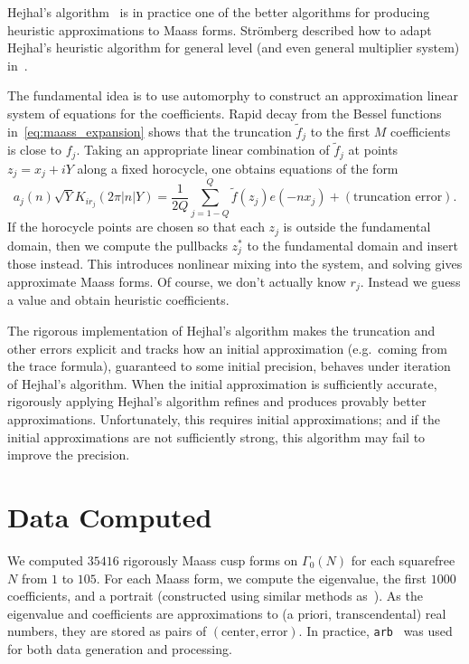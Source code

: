 \documentclass[11pt,reqno,oneside]{amsart}
\theoremstyle{plain}
\theoremstyle{definition}
\begin{document}
Hejhal's algorithm~\cite{hejhal1999eigenfunctions} is in practice one of the
better algorithms for producing heuristic approximations to Maass forms.
Str\"omberg described how to adapt Hejhal's heuristic algorithm for general
level (and even general multiplier system)
in~\cite{stromberg2005computational}.

The fundamental idea is to use automorphy to construct an approximation linear
system of equations for the coefficients.
Rapid decay from the Bessel functions in~\eqref{eq:maass_expansion} shows that
the truncation $\widetilde{f}_j$ to the first $M$ coefficients is close to
$f_j$.
Taking an appropriate linear combination of $\widetilde{f}_j$ at points $z_j =
x_j + iY$ along a fixed horocycle, one obtains equations of the form
\begin{equation}
  a_j(n) \sqrt{Y} K_{ir_j}(2 \pi \lvert n \rvert Y)
  =
  \frac{1}{2Q} \sum_{j = 1 - Q}^Q \widetilde{f}(z_j) e(-nx_j)
  +
  (\text{truncation error}).
\end{equation}
If the horocycle points are chosen so that each $z_j$ is outside the
fundamental domain, then we compute the pullbacks $z_j^*$ to the fundamental
domain and insert those instead.
This introduces nonlinear mixing into the system, and solving gives approximate
Maass forms.
Of course, we don't actually know $r_j$.
Instead we guess a value and obtain heuristic coefficients.

The rigorous implementation of Hejhal's algorithm makes the truncation and
other errors explicit and tracks how an initial approximation (e.g.\ coming
from the trace formula), guaranteed to some initial precision, behaves under
iteration of Hejhal's algorithm.
When the initial approximation is sufficiently accurate, rigorously applying
Hejhal's algorithm refines and produces provably better approximations.
Unfortunately, this requires initial approximations; and if the initial
approximations are not sufficiently strong, this algorithm may fail to improve
the precision.


\section{Data Computed}\label{sec:data}

We computed $35416$ rigorously Maass cusp forms on $\Gamma_0(N)$ for each
squarefree $N$ from $1$ to $105$.
For each Maass form, we compute the eigenvalue, the first $1000$ coefficients,
and a portrait (constructed using similar methods as~\cite{lowryduda_visualizing}).
As the eigenvalue and coefficients are approximations to (a priori,
transcendental) real numbers, they are stored as pairs of $(\text{center},
\text{error})$.
In practice, \texttt{arb}~\cite{arb} was used for both data generation and
processing.
\end{document}
